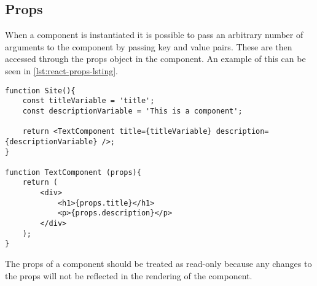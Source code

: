 \subsection*{Props}
When a component is instantiated it is possible to pass an arbitrary number of arguments to the component by passing key and value pairs.
These are then accessed through the props object in the component.
An example of this can be seen in \autoref{lst:react-props-lsting}.

\begin{lstlisting}[caption={An example of how properties are passed to children components}, label={lst:react-props-lsting}, captionpos=b]
function Site(){
	const titleVariable = 'title';
	const descriptionVariable = 'This is a component';

	return <TextComponent title={titleVariable} description={descriptionVariable} />;
}

function TextComponent (props){
	return (
		<div>
			<h1>{props.title}</h1>
			<p>{props.description}</p>
		</div>
	);
}
\end{lstlisting}
\noindent
The props of a component should be treated as read-only because any changes to the props will not be reflected in the rendering of the component.

